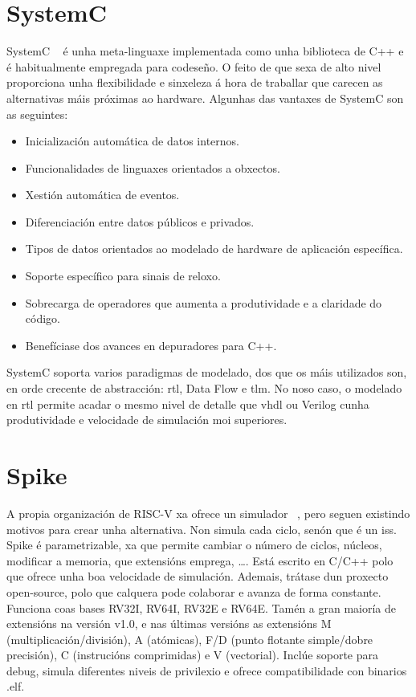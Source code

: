 \section{SystemC}\label{sec:systemc}
SystemC ~\cite{systemc} é unha \gls{meta-linguaxe} implementada como unha biblioteca de C++ e é habitualmente empregada para codeseño. O feito de que sexa de alto nivel proporciona unha flexibilidade e sinxeleza á hora de traballar que carecen as alternativas máis próximas ao hardware. Algunhas das vantaxes de SystemC son as seguintes:

\begin{itemize}
    \item Inicialización automática de datos internos.
    \item Funcionalidades de linguaxes orientados a obxectos.
    \item Xestión automática de eventos.
    \item Diferenciación entre datos públicos e privados.
    \item Tipos de datos orientados ao modelado de hardware de aplicación específica.
    \item Soporte específico para sinais de reloxo.
    \item Sobrecarga de operadores que aumenta a produtividade e a claridade do código.
    \item Benefíciase dos avances en depuradores para C++.
\end{itemize}

SystemC soporta varios paradigmas de modelado, dos que os máis utilizados son, en orde crecente de abstracción: \acrfull{rtl}, Data Flow e \acrfull{tlm}. No noso caso, o modelado en \acrshort{rtl} permite acadar o mesmo nivel de detalle que \acrshort{vhdl} ou Verilog cunha produtividade e velocidade de simulación moi superiores.


\section{Spike}\label{sec:spike}
A propia organización de RISC-V xa ofrece un simulador ~\cite{sim_spike}, pero seguen existindo motivos para crear unha alternativa. Non simula cada ciclo, senón que é un \acrfull{iss}. Spike é parametrizable, xa que permite cambiar o número de ciclos, núcleos, modificar a memoria, que extensións emprega, \dots. Está escrito en C/C++ polo que ofrece unha boa velocidade de simulación. Ademais, trátase dun proxecto open-source, polo que calquera pode colaborar e  avanza de forma constante. Funciona coas bases RV32I, RV64I, RV32E e RV64E. Tamén a gran maioría de extensións na versión v1.0, e nas últimas versións as extensións M (multiplicación/división), A (atómicas), F/D (punto flotante simple/dobre precisión), C (instrucións comprimidas) e V (vectorial). Inclúe soporte para debug, simula diferentes niveis de privilexio e ofrece compatibilidade con binarios .elf. 

